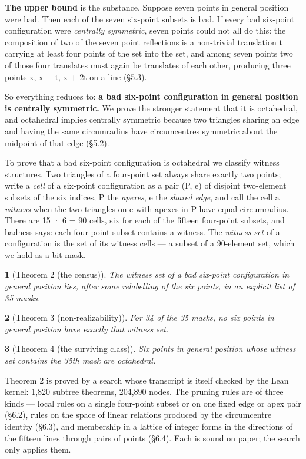 \documentclass[11pt,a4paper]{article}
\theoremstyle{named}
\newtheorem*{namedthm}{}
\begin{document}
\textbf{The upper bound} is the substance. Suppose seven points in general position were bad. Then each of the seven six-point subsets is bad. If every bad six-point configuration were \textit{centrally symmetric}, seven points could not all do this: the composition of two of the seven point reflections is a non-trivial translation t carrying at least four points of the set into the set, and among seven points two of those four translates must again be translates of each other, producing three points x, x + t, x + 2t on a line (§5.3).

So everything reduces to: \textbf{a bad six-point configuration in general position is centrally symmetric.} We prove the stronger statement that it is octahedral, and octahedral implies centrally symmetric because two triangles sharing an edge and having the same circumradius have circumcentres symmetric about the midpoint of that edge (§5.2).

To prove that a bad six-point configuration is octahedral we classify witness structures. Two triangles of a four-point set always share exactly two points; write a \textit{cell} of a six-point configuration as a pair (P, e) of disjoint two-element subsets of the six indices, P the \textit{apexes}, e the \textit{shared edge}, and call the cell a \textit{witness} when the two triangles on e with apexes in P have equal circumradius. There are 15 · 6 = 90 cells, six for each of the fifteen four-point subsets, and badness says: each four-point subset contains a witness. The \textit{witness set} of a configuration is the set of its witness cells — a subset of a 90-element set, which we hold as a bit mask.

\begin{namedthm}[Theorem 2 (the census)]
The witness set of a bad six-point configuration in general position lies, after some relabelling of the six points, in an explicit list of 35 masks.
\end{namedthm}

\begin{namedthm}[Theorem 3 (non-realizability)]
For 34 of the 35 masks, no six points in general position have exactly that witness set.
\end{namedthm}

\begin{namedthm}[Theorem 4 (the surviving class)]
Six points in general position whose witness set contains the 35th mask are octahedral.
\end{namedthm}

Theorem 2 is proved by a search whose transcript is itself checked by the Lean kernel: 1,820 subtree theorems, 204,890 nodes. The pruning rules are of three kinds — local rules on a single four-point subset or on one fixed edge or apex pair (§6.2), rules on the space of linear relations produced by the circumcentre identity (§6.3), and membership in a lattice of integer forms in the directions of the fifteen lines through pairs of points (§6.4). Each is sound on paper; the search only applies them.
\end{document}
